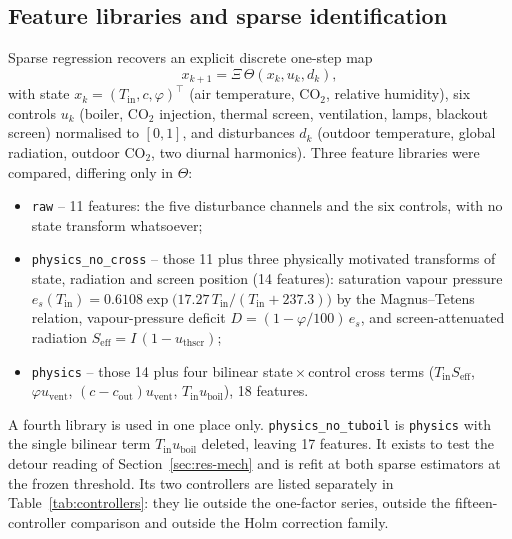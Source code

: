 \subsection{Feature libraries and sparse identification}
\label{sec:sindy}

Sparse regression \cite{brunton2016,brunton2016c,kaiser2018} recovers an explicit
discrete one-step map
%
\begin{equation}
x_{k+1}=\Xi\,\Theta(x_k,u_k,d_k),
\end{equation}
%
with state $x_k=(T_{\mathrm{in}},c,\varphi)^{\top}$ (air temperature, CO$_2$, relative
humidity), six controls $u_k$ (boiler, CO$_2$ injection, thermal screen, ventilation,
lamps, blackout screen) normalised to $[0,1]$, and disturbances $d_k$ (outdoor
temperature, global radiation, outdoor CO$_2$, two diurnal harmonics). Three feature
libraries were compared, differing only in $\Theta$:

\begin{itemize}
\item \texttt{raw} -- 11 features: the five disturbance channels and the six controls,
      with no state transform whatsoever;
\item \texttt{physics\_no\_cross} -- those 11 plus three physically motivated transforms
      of state, radiation and screen position (14 features): saturation vapour pressure
      $e_s(T_{\mathrm{in}})=0.6108\exp\bigl(17.27\,T_{\mathrm{in}}/(T_{\mathrm{in}}+237.3)\bigr)$
      by the Magnus--Tetens relation, vapour-pressure deficit $D=(1-\varphi/100)\,e_s$,
      and screen-attenuated radiation $S_{\mathrm{eff}}=I\,(1-u_{\mathrm{thscr}})$;
\item \texttt{physics} -- those 14 plus four bilinear state\,$\times$\,control cross
      terms ($T_{\mathrm{in}}S_{\mathrm{eff}}$, $\varphi u_{\mathrm{vent}}$,
      $(c-c_{\mathrm{out}})u_{\mathrm{vent}}$, $T_{\mathrm{in}}u_{\mathrm{boil}}$),
      18 features.
\end{itemize}

A fourth library is used in one place only. \texttt{physics\_no\_tuboil} is
\texttt{physics} with the single bilinear term $T_{\mathrm{in}}u_{\mathrm{boil}}$
deleted, leaving 17 features. It exists to test the detour reading of
Section~\ref{sec:res-mech} and is refit at both sparse estimators at the frozen
threshold. Its two controllers are listed separately in
Table~\ref{tab:controllers}: they lie outside the one-factor series, outside the
fifteen-controller comparison and outside the Holm correction family.

